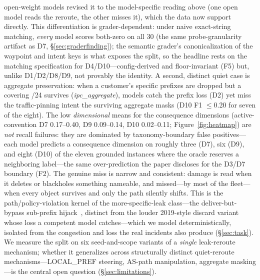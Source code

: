 \documentclass[11pt]{article}
\begin{document}
open-weight models revised it to the model-specific reading above (one open
model reads the reroute, the other misses it), which the data now support
directly. This
differentiation is grader-dependent: under naive exact-string matching,
\emph{every} model scores both-zero on all 30 (the same probe-granularity
artifact as D7, \S\ref{sec:graderfinding}); the semantic grader's
canonicalization of the waypoint and intent keys is what exposes the split,
so the headline rests on the matching specification for D4/D10---config-derived
and floor-invariant (F5) but, unlike D1/D2/D8/D9, not provably the identity. A second, distinct quiet case is aggregate preservation: when a
customer's specific prefixes are dropped but a covering /24 survives
(\emph{ipc\_aggregate}), models catch the prefix loss (D2) yet miss the
traffic-pinning intent the surviving aggregate masks (D10 F1 $\leq$0.20 for
seven of the eight). The low \emph{dimensional} means for the consequence
dimensions (active-convention D7 0.17--0.40, D9 0.09--0.14, D10 0.02--0.11;
Figure~\ref{fig:heatmap}) are \emph{not} recall failures: they are dominated
by taxonomy-boundary false positives---each model predicts a consequence
dimension on roughly three (D7), six (D9), and eight (D10) of the eleven
grounded instances where the oracle reserves a neighboring label---the same
over-prediction the paper discloses for the D3/D7 boundary (F2). The genuine
miss is narrow and consistent: damage is read when it deletes or blackholes
something nameable, and missed---by most of the fleet---when every object
survives and only the path silently shifts. This is the path/policy-violation
kernel of the more-specific-leak class---the deliver-but-bypass sub-prefix
hijack~\cite{pilosov}, distinct from the louder 2019-style discard variant
whose loss a competent model catches---which we model deterministically,
isolated from the congestion and loss the real incidents also produce
(\S\ref{sec:task}). We measure the split on
six seed-and-scope variants of a \emph{single} leak-reroute mechanism; whether
it generalizes across structurally distinct quiet-reroute mechanisms---LOCAL\_PREF
steering, AS-path manipulation, aggregate masking---is the central open
question (\S\ref{sec:limitations}).
\end{document}
